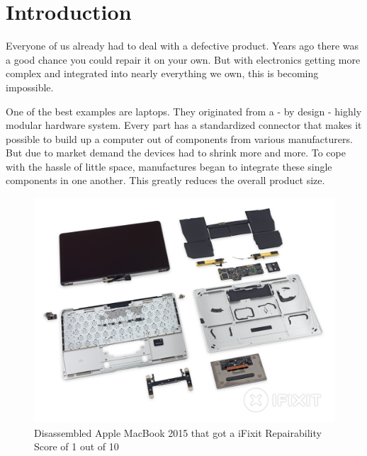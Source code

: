 
\chapter{Introduction}

	Everyone of us already had to deal with a defective product. Years ago there was a good chance you could repair it on your own. But with electronics getting more complex and integrated into nearly everything we own, this is becoming impossible.
	
	One of the best examples are laptops. They originated from a - by design - highly modular hardware system. Every part has a standardized connector that makes it possible to build up a computer out of components from various manufacturers. But due to market demand the devices had to shrink more and more. To cope with the hassle of little space, manufactures began to integrate these single components in one another. This greatly reduces the overall product size.
	
	\begin{figure}[H]
		\includegraphics[width=\textwidth, trim=0 0 0 3cm, clip]{../images/ifixit-macbook-parts.jpg}
		\centering
		\caption[Disassembled Apple MacBook 2015 that got an iFixit Repairability Score of 1 out of 10]{Disassembled Apple MacBook 2015 that got a iFixit Repairability Score of 1 out of 10\footnotemark}
		\label{fig:ifixit-macbook-parts}
	\end{figure}
	

